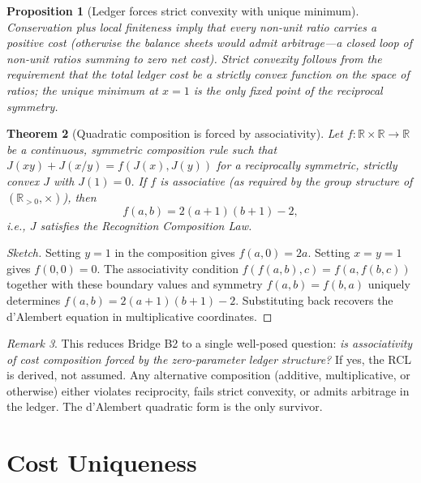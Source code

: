 \documentclass[11pt]{article}
\newcommand{\R}{\mathbb{R}}
\newcommand{\Rp}{\mathbb{R}_{>0}}
\newtheorem{theorem}{Theorem}[section]
\newtheorem{proposition}[theorem]{Proposition}
\theoremstyle{definition}
\theoremstyle{remark}
\newtheorem{remark}[theorem]{Remark}
\begin{document}
\begin{proposition}[Ledger forces strict convexity with unique minimum]
\label{prop:ledger-convex}
Conservation plus local finiteness imply that every non-unit
ratio carries a positive cost (otherwise the balance sheets
would admit arbitrage---a closed loop of non-unit ratios
summing to zero net cost).
Strict convexity follows from the requirement that the total
ledger cost be a strictly convex function on the space of ratios;
the unique minimum at $x = 1$ is the only fixed point of the
reciprocal symmetry.
\end{proposition}

\begin{theorem}[Quadratic composition is forced by associativity]
\label{thm:assoc-forces-rcl}
Let $f : \R \times \R \to \R$ be a continuous, symmetric
composition rule such that
$J(xy) + J(x/y) = f(J(x), J(y))$
for a reciprocally symmetric, strictly convex $J$ with $J(1) = 0$.
If $f$ is associative (as required by the group structure of
$(\Rp, \times)$), then
\[
f(a,b) = 2(a+1)(b+1) - 2,
\]
i.e., $J$ satisfies the Recognition Composition Law.
\end{theorem}
\begin{proof}[Sketch]
Setting $y = 1$ in the composition gives $f(a, 0) = 2a$.
Setting $x = y = 1$ gives $f(0, 0) = 0$.
The associativity condition
$f(f(a,b), c) = f(a, f(b,c))$ together with these boundary
values and symmetry $f(a,b) = f(b,a)$ uniquely determines
$f(a,b) = 2(a+1)(b+1) - 2$.
Substituting back recovers the d'Alembert equation in
multiplicative coordinates.
\end{proof}

\begin{remark}
This reduces Bridge B2 to a single well-posed question:
\emph{is associativity of cost composition forced by the
zero-parameter ledger structure?}
If yes, the RCL is derived, not assumed.
Any alternative composition (additive, multiplicative, or
otherwise) either violates reciprocity, fails strict convexity,
or admits arbitrage in the ledger.
The d'Alembert quadratic form is the only survivor.
\end{remark}

\section{Cost Uniqueness}\label{sec:t5}
\end{document}
